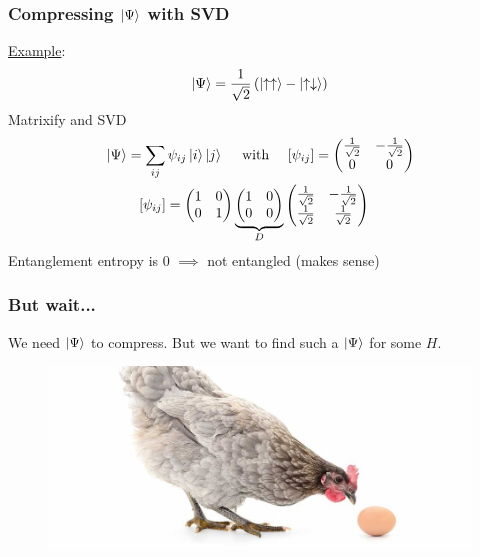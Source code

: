 \documentclass{beamer}
\theoremstyle{definition}
\newcommand{\lp}{\left(}
\newcommand{\rp}{\right)}
\newcommand{\f}[2]{\frac{#1}{#2}}
\begin{document}
\begin{frame}
	\frametitle{Compressing $\ket{\Psi}$ with SVD}
	
	\underline{Example}:  
	\begin{align*}
		\ket{\Psi} = \f{1}{\sqrt{2}}\lp \ket{\uparrow\uparrow} - \ket{\uparrow\downarrow} \rp
	\end{align*}
	Matrixify and SVD
	\begin{align*}
		&\ket{\Psi} = \sum_{ij}\psi_{ij}\ket{i}\ket{j} \quad \text{ with } \quad   [\psi_{ij}] = \begin{pmatrix}
			\f{1}{\sqrt{2}} & -\f{1}{\sqrt{2}} \\ 0 & 0
		\end{pmatrix}\\
		&\quad\quad \,\,\,[\psi_{ij}] = \begin{pmatrix}
			1 & 0 \\ 0 & 1
		\end{pmatrix}
		\underbrace{\begin{pmatrix}
				1 & 0 \\ 0 & 0 
		\end{pmatrix}}_D
		\begin{pmatrix}
			\f{1}{\sqrt{2}} & -\f{1}{\sqrt{2}} \\ 	\f{1}{\sqrt{2}} & \f{1}{\sqrt{2}}
		\end{pmatrix}
	\end{align*}
	\pause Entanglement entropy is 0 $\implies$ not entangled (makes sense)
\end{frame}



\begin{frame}
	\frametitle{But wait...}
		
	We need $\ket{\Psi}$ to compress. But we want to find such a $\ket{\Psi}$ for some $H$. \\
	
	\pause
	
	\vspace{15pt}
	
	\begin{figure}[!htb]
		\centering
		\includegraphics[scale=0.2]{chickenegg.jpg}
	\end{figure}
	
	\vspace{8pt}

\end{frame}
\end{document}
